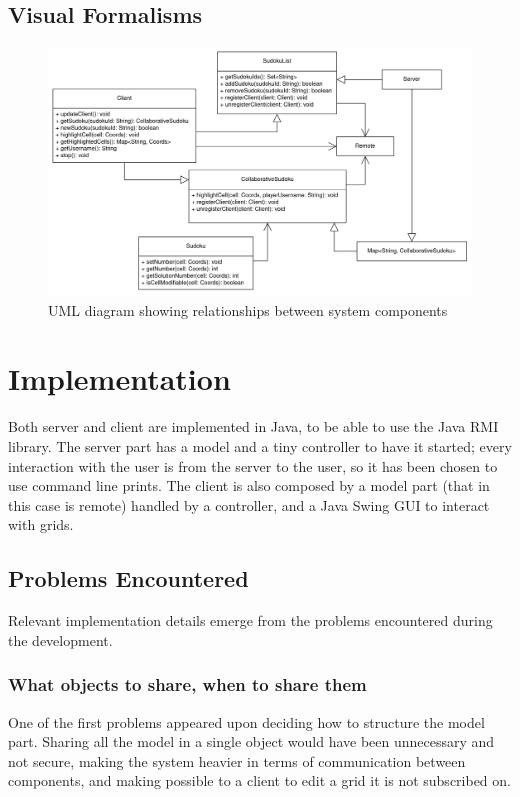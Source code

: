 \documentclass[12pt, a4paper]{report}
\begin{document}
\section{Visual Formalisms}
\begin{figure}
    \centering
    \includegraphics{class-diagram.png}
    \caption{UML diagram showing relationships between system components}
\end{figure}

\chapter{Implementation}
Both server and client are implemented in Java, to be able to use the Java RMI
 library. The server part has a model and a tiny controller to have it started;
 every interaction with the user is from the server to the user, so it has been
 chosen to use command line prints. The client is also composed by a model part
 (that in this case is remote) handled by a controller, and a Java Swing GUI to
 interact with grids.

\section{Problems Encountered}
Relevant implementation details emerge from the problems encountered during the
 development.

\subsection{What objects to share, when to share them}
One of the first problems appeared upon deciding how to structure the model
 part. Sharing all the model in a single object would have been unnecessary
 and not secure, making the system heavier in terms of communication between
 components, and making possible to a client to edit a grid it is not
 subscribed on.
\end{document}
